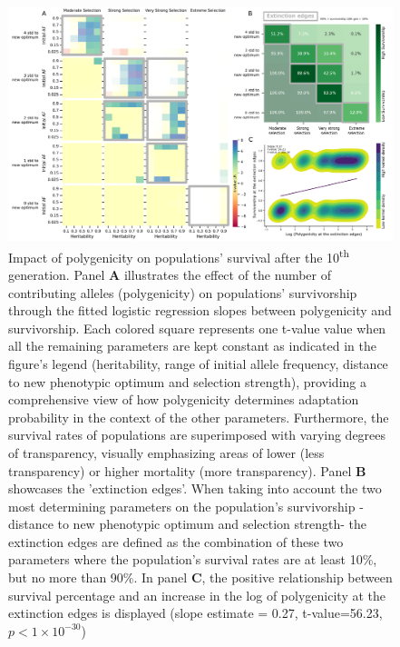 \documentclass{article}
\begin{document}
\begin{figure}[H]
  \centering
  \includegraphics[width=1\textwidth]{figures/poly_survivalship_value_edges.pdf}
  \caption{Impact of polygenicity on populations' survival after the 10\textsuperscript{th} generation. Panel \textbf{A} illustrates the effect of the number of contributing alleles (polygenicity) on populations' survivorship through the fitted logistic regression slopes between polygenicity and survivorship. Each colored square represents one t-value value when all the remaining parameters are kept constant as indicated in the figure's legend (heritability, range of initial allele frequency, distance to new phenotypic optimum and selection strength), providing a comprehensive view of how polygenicity determines adaptation probability in the context of the other parameters. Furthermore, the survival rates of populations are superimposed with varying degrees of transparency, visually emphasizing areas of lower (less transparency) or higher mortality (more transparency). Panel \textbf{B} showcases the 'extinction edges'. When taking into account the two most determining parameters on the population's survivorship -distance to new phenotypic optimum and selection strength- the extinction edges are defined as the combination of these two parameters where the population's survival rates are at least 10\%, but no more than 90\%. In panel \textbf{C}, the positive relationship between survival percentage and an increase in the log of polygenicity at the extinction edges is displayed (slope estimate = 0.27, t-value=56.23, $p<1 \times 10^{-30}$)}
  \label{fig:poly_panel_figure}
\end{figure}
\end{document}
